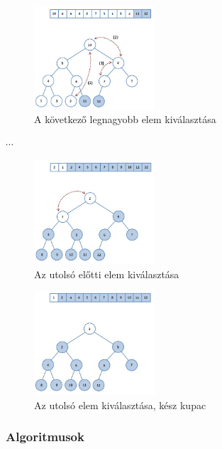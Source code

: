 \documentclass[12pt,margin=0px]{article}
\begin{document}
   	\begin{figure}[H]
		\centering
		\includegraphics[width=0.4\textwidth]{img/heap_sort2.png}
		\caption{A következő legnagyobb elem kiválasztása}
        \label{fig:heap_sort2}
	\end{figure}

    \begin{center}
        $\cdots$
    \end{center}

   	\begin{figure}[H]
		\centering
		\includegraphics[width=0.4\textwidth]{img/heap_sort3.png}
		\caption{Az utolsó előtti elem kiválasztása}
        \label{fig:heap_sort3}
	\end{figure}

   	\begin{figure}[H]
		\centering
		\includegraphics[width=0.4\textwidth]{img/heap_sort4.png}
		\caption{Az utolsó elem kiválasztása, kész kupac}
        \label{fig:heap_sort4}
	\end{figure}

    \subsubsection*{Algoritmusok}
\end{document}
